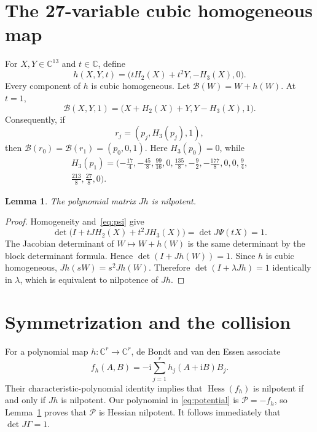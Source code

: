 \documentclass[11pt]{article}
\newtheorem{lemma}[theorem]{Lemma}
\newcommand{\C}{\mathbb C}
\newcommand{\cP}{\mathcal P}
\newcommand{\ii}{\mathrm i}
\newcommand{\Hess}{\operatorname{Hess}}
\begin{document}
\section{The 27-variable cubic homogeneous map}

For $X,Y\in\C^{13}$ and $t\in\C$, define
\begin{equation}
 h(X,Y,t)=\bigl(tH_2(X)+t^2Y,-H_3(X),0\bigr).
 \label{eq:h}
\end{equation}
Every component of $h$ is cubic homogeneous.  Let
$\mathcal B(W)=W+h(W)$.  At $t=1$,
\begin{equation}
 \mathcal B(X,Y,1)=\bigl(X+H_2(X)+Y,Y-H_3(X),1\bigr).
\end{equation}
Consequently, if
\begin{equation}
 r_j=(p_j,H_3(p_j),1),
 \label{eq:rj}
\end{equation}
then $\mathcal B(r_0)=\mathcal B(r_1)=(p_0,0,1)$.  Here $H_3(p_0)=0$, while
\begin{multline}
H_3(p_1)=(-\tfrac{17}4,-\tfrac{45}8,\tfrac{99}{16},0,
\tfrac{135}8,-\tfrac92,-\tfrac{177}8,0,0,\tfrac94,\\
\tfrac{213}8,\tfrac{27}8,0).
\end{multline}

\begin{lemma}\label{lem:nilpotent}
The polynomial matrix $Jh$ is nilpotent.
\end{lemma}
\begin{proof}
Homogeneity and~\eqref{eq:psi} give
\begin{equation}
 \det\bigl(I+tJH_2(X)+t^2JH_3(X)\bigr)
   =\det J\Psi(tX)=1.
 \label{eq:det-homogeneous}
\end{equation}
The Jacobian determinant of $W\mapsto W+h(W)$ is the same determinant by the
block determinant formula.  Hence $\det(I+Jh(W))=1$.  Since $h$ is cubic
homogeneous, $Jh(sW)=s^2Jh(W)$.  Therefore $\det(I+\lambda Jh)=1$
identically in $\lambda$, which is equivalent to nilpotence of $Jh$.
\end{proof}

\section{Symmetrization and the collision}

For a polynomial map $h:\C^r\to\C^r$, de Bondt and van den Essen
\cite{debondt-vandenessen} associate
\begin{equation}
 f_h(A,B)=-\ii\sum_{j=1}^r h_j(A+\ii B)B_j.
\end{equation}
Their characteristic-polynomial identity implies that $\Hess(f_h)$ is
nilpotent if and only if $Jh$ is nilpotent.  Our polynomial in
\eqref{eq:potential} is $\cP=-f_h$, so Lemma~\ref{lem:nilpotent} proves that
$\cP$ is Hessian nilpotent.  It follows immediately that $\det J\Gamma=1$.
\end{document}
